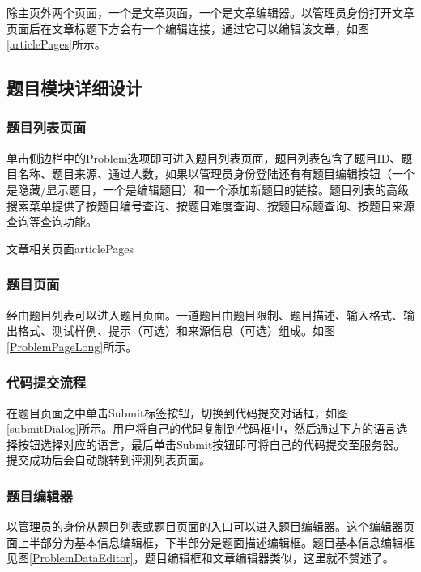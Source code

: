 除主页外两个页面，一个是文章页面，一个是文章编辑器。以管理员身份打开文章页面后在文章标题下方会有一个编辑连接，通过它可以编辑该文章，如图\ref{articlePages}所示。

\subsection{题目模块详细设计}
\subsubsection{题目列表页面}
单击侧边栏中的Problem选项即可进入题目列表页面，题目列表包含了题目ID、题目名称、题目来源、通过人数，如果以管理员身份登陆还有有题目编辑按钮（一个是隐藏/显示题目，一个是编辑题目）和一个添加新题目的链接。题目列表的高级搜索菜单提供了按题目编号查询、按题目难度查询、按题目标题查询、按题目来源查询等查询功能。

\begin{pics}[htbp]{文章相关页面}{articlePages}
\end{pics}


\subsubsection{题目页面}
经由题目列表可以进入题目页面。一道题目由题目限制、题目描述、输入格式、输出格式、测试样例、提示（可选）和来源信息（可选）组成。如图\ref{ProblemPageLong}所示。


\subsubsection{代码提交流程}
在题目页面之中单击Submit标签按钮，切换到代码提交对话框，如图\ref{submitDialog}所示。用户将自己的代码复制到代码框中，然后通过下方的语言选择按钮选择对应的语言，最后单击Submit按钮即可将自己的代码提交至服务器。提交成功后会自动跳转到评测列表页面。


\subsubsection{题目编辑器}
以管理员的身份从题目列表或题目页面的入口可以进入题目编辑器。这个编辑器页面上半部分为基本信息编辑框，下半部分是题面描述编辑框。题目基本信息编辑框见图\ref{ProblemDataEditor}，题目编辑框和文章编辑器类似，这里就不赘述了。

